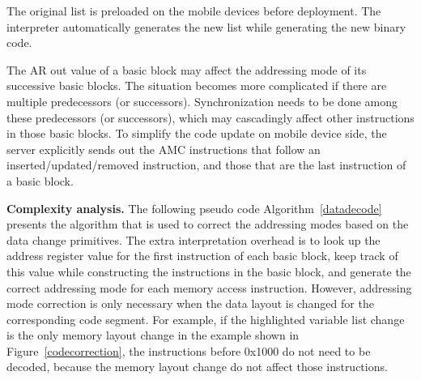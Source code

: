 The original list is preloaded on the mobile devices before deployment. The interpreter automatically generates the new 
list while generating the new binary code. 

The AR out value of a basic block may affect the addressing mode of its successive basic blocks. The situation becomes 
more complicated if there are multiple predecessors (or successors). Synchronization needs to be done among these 
predecessors (or successors), which may cascadingly affect other instructions in those basic blocks. To simplify the 
code update on mobile device side, the server explicitly sends out the AMC instructions that follow an 
inserted/updated/removed instruction, and those that are the last instruction of a basic block.

{\bf Complexity analysis.}
The following pseudo code Algorithm~\ref{datadecode} presents the algorithm that is used to correct the addressing 
modes based on the data change primitives. The extra interpretation overhead is to look up the address register value 
for the first instruction of each basic block, keep track of this value while constructing the instructions in the 
basic block, and generate the correct addressing mode for each memory access instruction. However, addressing mode 
correction is only necessary 
when the data layout is changed for the corresponding code segment. For example, if the highlighted variable list 
change is the only memory layout change in the example shown in Figure~\ref{codecorrection}, the instructions before 
0x1000 do not need to be decoded, because the memory layout change do not affect those instructions.



